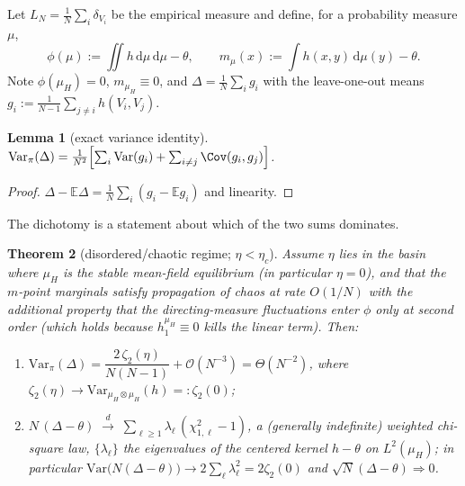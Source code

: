 \documentclass[11pt]{article}
\newtheorem{theorem}{Theorem}
\newtheorem{lemma}[theorem]{Lemma}
\theoremstyle{definition}
\newcommand{\E}{\mathbb{E}}
\newcommand{\Var}{\mathrm{Var}}
\newcommand{\dd}{\mathrm{d}}
\newcommand{\xto}{\xrightarrow{d}}
\begin{document}
Let $L_N=\frac1N\sum_i\delta_{V_i}$ be the empirical measure and define, for a
probability measure $\mu$,
\[
\phi(\mu):=\iint h\,\dd\mu\,\dd\mu-\theta,
\qquad
m_\mu(x):=\int h(x,y)\,\dd\mu(y)-\theta .
\]
Note $\phi(\mu_H)=0$, $m_{\mu_H}\equiv0$, and $\Delta=\frac1N\sum_i g_i$ with the
leave-one-out means $g_i:=\frac1{N-1}\sum_{j\ne i}h(V_i,V_j)$.

\begin{lemma}[exact variance identity]
\label{lem:varid}
$\Var_\pi(\Delta)=\frac1{N^2}\Bigl[\sum_i\Var(g_i)+\sum_{i\ne j}\Cov(g_i,g_j)\Bigr]$.
\end{lemma}
\begin{proof}
$\Delta-\E\Delta=\frac1N\sum_i(g_i-\E g_i)$ and linearity.
\end{proof}

The dichotomy is a statement about which of the two sums dominates.

\begin{theorem}[disordered/chaotic regime; $\eta<\eta_c$]
\label{thm:dis}
Assume $\eta$ lies in the basin where $\mu_H$ is the stable mean-field equilibrium
(in particular $\eta=0$), and that the $m$-point marginals satisfy propagation of
chaos at rate $O(1/N)$ with the additional property that the directing-measure
fluctuations enter $\phi$ only at second order (which holds because
$h_1^{\mu_H}\equiv0$ kills the linear term). Then:
\begin{enumerate}
\item $\Var_\pi(\Delta)=\dfrac{2\,\zeta_2(\eta)}{N(N-1)}+\mathcal O(N^{-3})
=\Theta(N^{-2})$, where $\zeta_2(\eta)\to\Var_{\mu_H\otimes\mu_H}(h)=:\zeta_2(0)$;
\item $N\,(\Delta-\theta)\;\xto\;\displaystyle\sum_{\ell\ge1}\lambda_\ell\,
(\chi^2_{1,\ell}-1)$,
a (generally indefinite) weighted chi-square law, $\{\lambda_\ell\}$ the eigenvalues
of the centered kernel $h-\theta$ on $L^2(\mu_H)$; in particular
$\Var\bigl(N(\Delta-\theta)\bigr)\to2\sum_\ell\lambda_\ell^2=2\zeta_2(0)$ and
$\sqrt N(\Delta-\theta)\Rightarrow0$.
\end{enumerate}
\end{theorem}
\end{document}
